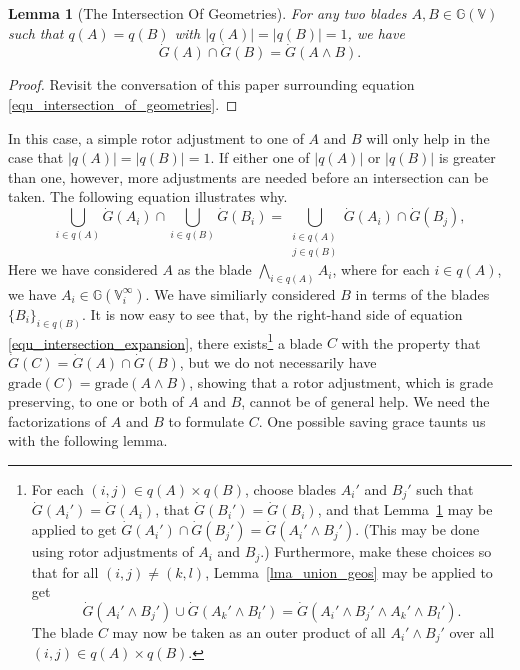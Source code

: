 \documentclass{birkjour}
\newtheorem{lem}[thm]{Lemma}
\theoremstyle{definition}
\theoremstyle{remark}
\numberwithin{equation}{section}
\newcommand{\G}{\mathbb{G}}
\newcommand{\V}{\mathbb{V}}
\newcommand{\Gi}{\dot{G}}
\begin{document}
\begin{lem}[The Intersection Of Geometries]\label{lma_intersect_geos}
For any two blades $A,B\in\G(\V)$ such that $q(A)=q(B)$
with $|q(A)|=|q(B)|=1$, we have
\begin{equation}
\Gi(A)\cap\Gi(B)=\Gi(A\wedge B).
\end{equation}
\end{lem}
\begin{proof}
Revisit the conversation of this paper surrounding equation \eqref{equ_intersection_of_geometries}.
\end{proof}
In this case, a simple rotor adjustment to one of $A$ and $B$ will only help
in the case that $|q(A)|=|q(B)|=1$.  If either one of $|q(A)|$ or $|q(B)|$
is greater than one, however, more adjustments are needed before an intersection can
be taken.  The following equation illustrates why.
\begin{equation}\label{equ_intersection_expansion}
\bigcup_{i\in q(A)}\Gi(A_i)\cap\bigcup_{i\in q(B)}\Gi(B_i) =
\bigcup_{\substack{i\in q(A)\\j\in q(B)}} \Gi(A_i)\cap \Gi(B_j),
\end{equation}
Here we have considered $A$ as the blade $\bigwedge_{i\in q(A)}A_i$, where
for each $i\in q(A)$, we have $A_i\in\G(\V_i^\infty)$.  We have similiarly
considered $B$ in terms of the blades $\{B_i\}_{i\in q(B)}$.  It is now
easy to see that, by the right-hand side of equation \eqref{equ_intersection_expansion},
there exists\footnote{For each $(i,j)\in q(A)\times q(B)$, choose blades $A_i'$ and
$B_j'$ such that $\Gi(A_i')=\Gi(A_i)$, that $\Gi(B_i')=\Gi(B_i)$, and that
Lemma~\ref{lma_intersect_geos} may be applied
to get $\Gi(A_i')\cap\Gi(B_j')=\Gi(A_i'\wedge B_j')$.  (This may be done using rotor
adjustments of $A_i$ and $B_j$.)
Furthermore, make these choices so that for all $(i,j)\neq (k,l)$, Lemma~\ref{lma_union_geos}
may be applied to get
\begin{equation*}
\Gi(A_i'\wedge B_j')\cup\Gi(A_k'\wedge B_l')=\Gi(A_i'\wedge B_j'\wedge A_k'\wedge B_l').
\end{equation*}
The blade $C$ may now be taken as an outer product of all $A_i'\wedge B_j'$
over all $(i,j)\in q(A)\times q(B)$.} a blade $C$
with the property that $\Gi(C)=\Gi(A)\cap\Gi(B)$, but we do not necessarily
have $\mbox{grade}(C)=\mbox{grade}(A\wedge B)$, showing that a rotor
adjustment, which is grade preserving, to one or both of $A$ and $B$, cannot
be of general help.  We need the factorizations of $A$ and $B$ to formulate $C$.
One possible saving grace taunts us with the following lemma.
\end{document}
